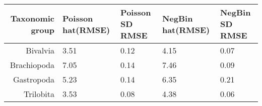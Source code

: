 \begin{table}[ht]
\centering
\begin{tabular}{r|llll}
  \hline
Taxonomic group & Poisson hat(RMSE) & Poisson SD RMSE & NegBin hat(RMSE) & NegBin SD RMSE \\ 
  \hline
Bivalvia & 3.51 & 0.12 & 4.15 & 0.07 \\ 
  Brachiopoda & 7.05 & 0.14 & 7.46 & 0.09 \\ 
  Gastropoda & 5.23 & 0.14 & 6.35 & 0.21 \\ 
  Trilobita & 3.53 & 0.08 & 4.38 & 0.06 \\ 
   \hline
\end{tabular}
\label{tab:cv_rmse}
\end{table}
